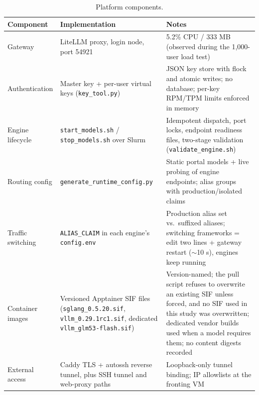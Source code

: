 \documentclass[11pt]{article}
\begin{document}
\begin{table}[t]
\centering
\small
\begin{tabularx}{\textwidth}{lXX}
\toprule
\textbf{Component} & \textbf{Implementation} & \textbf{Notes} \\
\midrule
Gateway & LiteLLM proxy, login node, port 54921 & 5.2\% CPU / 333 MB (observed during the 1,000-user load test) \\
Authentication & Master key + per-user virtual keys (\texttt{key\_tool.py}) & JSON key store with flock and atomic writes; no database; per-key RPM/TPM limits enforced in memory \\
Engine lifecycle & \texttt{start\_models.sh} / \texttt{stop\_models.sh} over Slurm & Idempotent dispatch, port locks, endpoint readiness files, two-stage validation (\texttt{validate\_engine.sh}) \\
Routing config & \texttt{generate\_runtime\_config.py} & Static portal models + live probing of engine endpoints; alias groups with production/isolated claims \\
Traffic switching & \texttt{ALIAS\_CLAIM} in each engine's \texttt{config.env} & Production alias set vs.\ suffixed aliases; switching frameworks = edit two lines + gateway restart ($\sim$10 s), engines keep running \\
Container images & Versioned Apptainer SIF files (\texttt{sglang\_0.5.20.sif}, \texttt{vllm\_0.29.1rc1.sif}, dedicated \texttt{vllm\_glm53-flash.sif}) & Version-named; the pull script refuses to overwrite an existing SIF unless forced, and no SIF used in this study was overwritten; dedicated vendor builds used when a model requires them; no content digests recorded \\
External access & Caddy TLS + autossh reverse tunnel, plus SSH tunnel and web-proxy paths & Loopback-only tunnel binding; IP allowlists at the fronting VM \\
\bottomrule
\end{tabularx}
\caption{Platform components.}
\label{tab:components}
\end{table}
\end{document}
